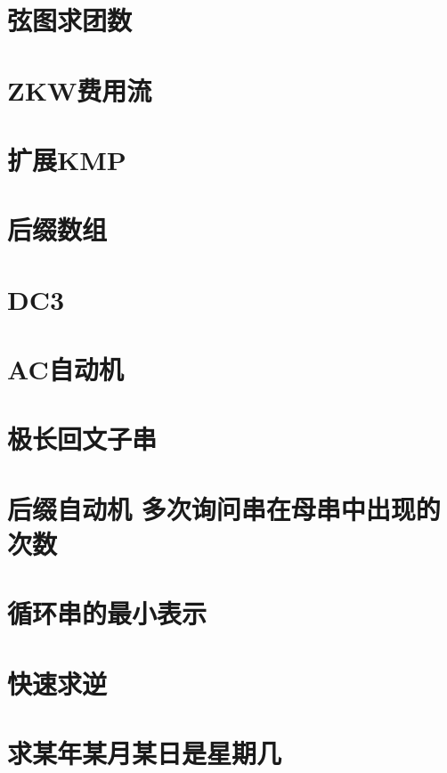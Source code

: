 \documentclass[landscape, twocolumn, 8pt, a4paper, twoside]{extarticle}
\begin{document}
\section{弦图求团数}
	
\section{ZKW费用流}
	

\section{扩展KMP}
	
\section{后缀数组}
	
\section{DC3}
	
\section{AC自动机}
	
\section{极长回文子串}
	
\section{后缀自动机 多次询问串在母串中出现的次数}
	
\section{循环串的最小表示}
	

\section{快速求逆}
	
\section{求某年某月某日是星期几}
	
\end{document}
